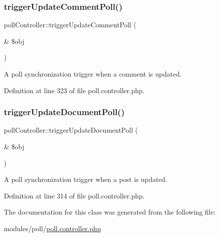 \subsubsection{\texorpdfstring{trigger\+Update\+Comment\+Poll()}{triggerUpdateCommentPoll()}}
{\footnotesize\ttfamily poll\+Controller\+::trigger\+Update\+Comment\+Poll (\begin{DoxyParamCaption}\item[{\&}]{\$obj }\end{DoxyParamCaption})}



A poll synchronization trigger when a comment is updated. 



Definition at line 323 of file poll.\+controller.\+php.

\hypertarget{classpollController_a20c5267c985ebf4484a61b238850f0c5}{}\label{classpollController_a20c5267c985ebf4484a61b238850f0c5} 
\subsubsection{\texorpdfstring{trigger\+Update\+Document\+Poll()}{triggerUpdateDocumentPoll()}}
{\footnotesize\ttfamily poll\+Controller\+::trigger\+Update\+Document\+Poll (\begin{DoxyParamCaption}\item[{\&}]{\$obj }\end{DoxyParamCaption})}



A poll synchronization trigger when a post is updated. 



Definition at line 314 of file poll.\+controller.\+php.



The documentation for this class was generated from the following file\+:\begin{DoxyCompactItemize}
\item 
modules/poll/\hyperlink{poll_8controller_8php}{poll.\+controller.\+php}\end{DoxyCompactItemize}
